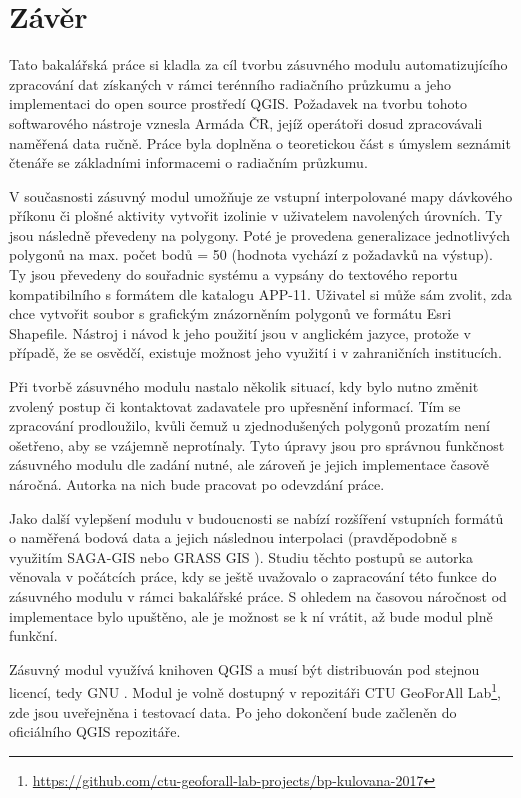 \chapter{Závěr}
\label{5-zaver}


Tato bakalářská práce si kladla za cíl tvorbu zásuvného modulu
automatizujícího zpracování dat získaných v rámci terénního radiačního
průzkumu a jeho implementaci do open source prostředí QGIS. Požadavek
na tvorbu tohoto softwarového nástroje vznesla Armáda ČR, jejíž
operátoři dosud zpracovávali naměřená data ručně. Práce byla doplněna
o teoretickou část s úmyslem seznámit čtenáře se základními
informacemi o radiačním průzkumu.

V současnosti zásuvný modul umožňuje ze vstupní interpolované mapy
dávkového příkonu či plošné aktivity vytvořit izolinie v uživatelem
navolených úrovních. Ty jsou následně převedeny na polygony. Poté je
provedena generalizace jednotlivých polygonů na max. počet bodů = 50
(hodnota vychází z požadavků na výstup). Ty jsou převedeny do
souřadnic systému  a vypsány do textového reportu
kompatibilního s formátem dle katalogu APP-11. Uživatel si může sám
zvolit, zda chce vytvořit soubor s grafickým znázorněním polygonů ve
formátu Esri Shapefile. Nástroj i návod k jeho použití jsou v
anglickém jazyce, protože v případě, že se osvědčí, existuje možnost
jeho využití i v zahraničních institucích.

Při tvorbě zásuvného modulu nastalo několik situací, kdy bylo nutno
změnit zvolený postup či kontaktovat zadavatele pro upřesnění
informací. Tím se zpracování prodloužilo, kvůli čemuž u zjednodušených
polygonů prozatím není ošetřeno, aby se vzájemně neprotínaly. Tyto
úpravy jsou pro správnou funkčnost zásuvného modulu dle zadání nutné,
ale zároveň je jejich implementace časově náročná. Autorka na nich
bude pracovat po odevzdání práce.

Jako další vylepšení modulu v budoucnosti se nabízí rozšíření
vstupních formátů o naměřená bodová data a jejich následnou
interpolaci (pravděpodobně s využitím SAGA-GIS nebo GRASS GIS
). Studiu těchto postupů se autorka věnovala v počátcích
práce, kdy se ještě uvažovalo o zapracování této funkce do zásuvného
modulu v rámci bakalářské práce. S ohledem na časovou náročnost od
implementace bylo upuštěno, ale je možnost se k ní vrátit, až bude
modul plně funkční.

Zásuvný modul využívá knihoven QGIS a musí být distribuován pod
stejnou licencí, tedy GNU . Modul je volně dostupný v
repozitáři CTU GeoForAll
Lab\footnote{\url{https://github.com/ctu-geoforall-lab-projects/bp-kulovana-2017}},
zde jsou uveřejněna i testovací data. Po jeho dokončení bude začleněn
do oficiálního QGIS repozitáře.
